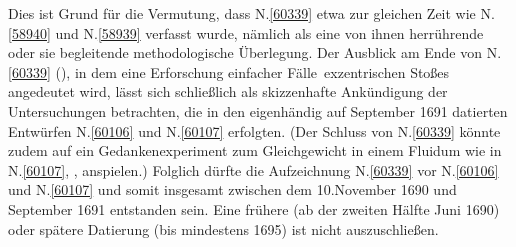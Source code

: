 Dies ist Grund für die Vermutung, dass N.\;\ref{60339} etwa zur gleichen Zeit wie N.\;\ref{58940} und N.\;\ref{58939} verfasst wurde, nämlich als eine von ihnen herrührende oder sie begleitende methodologische Überlegung.
\pend%
\pstart%
Der Ausblick am Ende von N.\;\ref{60339} (), in dem eine Erforschung \glqq einfacher Fälle\grqq\ exzentrischen Stoßes angedeutet wird, lässt sich schließlich als skizzenhafte Ankündigung der Untersuchungen betrachten, die in den eigenhändig auf September 1691 datierten Entwürfen N.\;\ref{60106} und N.\;\ref{60107} erfolgten.
(Der Schluss von N.\;\ref{60339} könnte zudem auf ein Gedankenexperiment zum Gleichgewicht in einem Fluidum wie in N.\;\ref{60107}, , anspielen.)
Folglich dürfte die Aufzeichnung N.\;\ref{60339} vor N.\;\ref{60106} und N.\;\ref{60107} und somit insgesamt zwischen dem 10.\;November 1690 und September 1691 entstanden sein.
Eine frühere (ab der zweiten Hälfte Juni 1690) oder spätere Datierung (bis mindestens 1695) ist nicht auszuschließen.
\pend%
%
\frenchspacing%
\normalsize%
